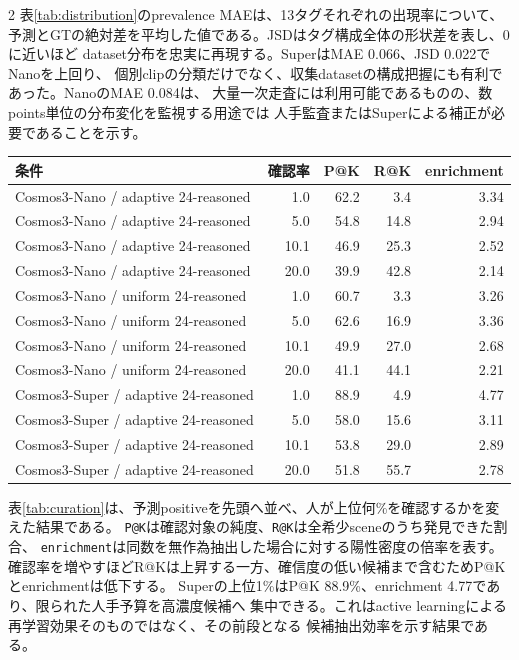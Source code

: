 \documentclass[9pt,a4paper]{extarticle}
\begin{document}
\begin{multicols}{2}
表\ref{tab:distribution}のprevalence MAEは、13タグそれぞれの出現率について、
予測とGTの絶対差を平均した値である。JSDはタグ構成全体の形状差を表し、0に近いほど
dataset分布を忠実に再現する。SuperはMAE 0.066、JSD 0.022でNanoを上回り、
個別clipの分類だけでなく、収集datasetの構成把握にも有利であった。NanoのMAE 0.084は、
大量一次走査には利用可能であるものの、数points単位の分布変化を監視する用途では
人手監査またはSuperによる補正が必要であることを示す。

\begin{center}
\centering
{}
\label{tab:curation}
\scriptsize
\begin{tabular}{lrrrr}
\toprule
条件 & 確認率 & P@K & R@K & enrichment\\
\midrule
Cosmos3-Nano / adaptive 24-reasoned & 1.0 & 62.2 & 3.4 & 3.34 \\
Cosmos3-Nano / adaptive 24-reasoned & 5.0 & 54.8 & 14.8 & 2.94 \\
Cosmos3-Nano / adaptive 24-reasoned & 10.1 & 46.9 & 25.3 & 2.52 \\
Cosmos3-Nano / adaptive 24-reasoned & 20.0 & 39.9 & 42.8 & 2.14 \\
Cosmos3-Nano / uniform 24-reasoned & 1.0 & 60.7 & 3.3 & 3.26 \\
Cosmos3-Nano / uniform 24-reasoned & 5.0 & 62.6 & 16.9 & 3.36 \\
Cosmos3-Nano / uniform 24-reasoned & 10.1 & 49.9 & 27.0 & 2.68 \\
Cosmos3-Nano / uniform 24-reasoned & 20.0 & 41.1 & 44.1 & 2.21 \\
Cosmos3-Super / adaptive 24-reasoned & 1.0 & 88.9 & 4.9 & 4.77 \\
Cosmos3-Super / adaptive 24-reasoned & 5.0 & 58.0 & 15.6 & 3.11 \\
Cosmos3-Super / adaptive 24-reasoned & 10.1 & 53.8 & 29.0 & 2.89 \\
Cosmos3-Super / adaptive 24-reasoned & 20.0 & 51.8 & 55.7 & 2.78 \\
\bottomrule
\end{tabular}
\end{center}

表\ref{tab:curation}は、予測positiveを先頭へ並べ、人が上位何\%を確認するかを変えた結果である。
\texttt{P@K}は確認対象の純度、\texttt{R@K}は全希少sceneのうち発見できた割合、
\texttt{enrichment}は同数を無作為抽出した場合に対する陽性密度の倍率を表す。
確認率を増やすほどR@Kは上昇する一方、確信度の低い候補まで含むためP@Kとenrichmentは低下する。
Superの上位1\%はP@K 88.9\%、enrichment 4.77であり、限られた人手予算を高濃度候補へ
集中できる。これはactive learningによる再学習効果そのものではなく、その前段となる
候補抽出効率を示す結果である。


\end{multicols}
\end{document}
